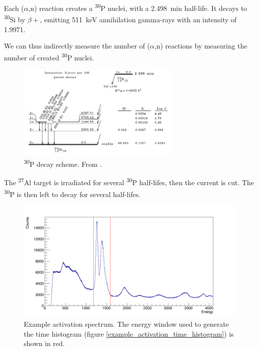 \documentclass[a4paper,12pt]{report}
\newcommand{\an}{($\alpha$,n) }
\newcommand{\Aliso}{\textsuperscript{27}Al }
\newcommand{\Piso}{\textsuperscript{30}P }
\begin{document}
Each \an reaction creates a \Piso nuclei, with a \qty{2.498}{\minute} half-life.
It decays to \textsuperscript{30}Si by $\beta +$, emitting \qty{511}{\keV} annihilation gamma-rays with an intensity of \num{1.9971}.\cite{nucleardatasheets}

We can thus indirectly measure the number of \an reactions by measuring the number of created \Piso nuclei.
\\

\begin{figure}[H]
	\centering
	\includegraphics[width=0.7\textwidth]{Piso_decay_scheme.png}
	\caption{\Piso decay scheme.
	From \cite{nucleardatasheets}.}
	\label{Piso_decay_scheme}
\end{figure}

The \Aliso target is irradiated for several \Piso half-lifes, then the current is cut.
The \Piso is then left to decay for several half-lifes.

\begin{figure}[H]
	\centering
	\includegraphics[width=\textwidth]{example_activation_energy_histogram.png}
	\caption{Example activation spectrum.
	The energy window used to generate the time histogram (figure \ref{example_activation_time_histogram}) is shown in red.}
	\label{example_activation_energy_histogram}
\end{figure}
\end{document}
